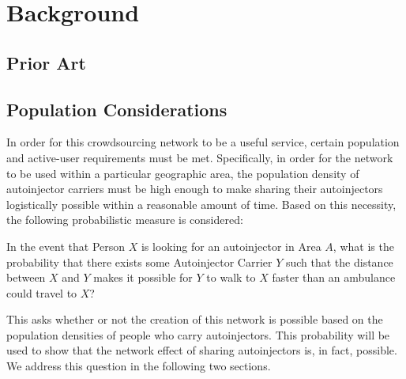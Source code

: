 \section{Background} \label{background}

\onehalfspacing

\subsection{Prior Art}

\subsection{Population Considerations}

In order for this crowdsourcing network to be a useful service, certain population and active-user requirements must be met. Specifically, in order for the network to be used within a particular geographic area, the population density of autoinjector carriers must be high enough to make sharing their autoinjectors logistically possible within a reasonable amount of time. Based on this necessity, the following probabilistic measure is considered:\newline
\begin{adjustwidth}{2.5em}{0pt}
    In the event that Person $X$ is looking for an autoinjector in Area $A$, what is the probability that there exists some Autoinjector Carrier $Y$ such that the distance between $X$ and $Y$ makes it possible for $Y$ to walk to $X$ faster than an ambulance could travel to $X$?
\end{adjustwidth}
\noindent\newline This asks whether or not the creation of this network is possible based on the population densities of people who carry autoinjectors. This probability will be used to show that the network effect of sharing autoinjectors is, in fact, possible. We address this question in the following two sections.


